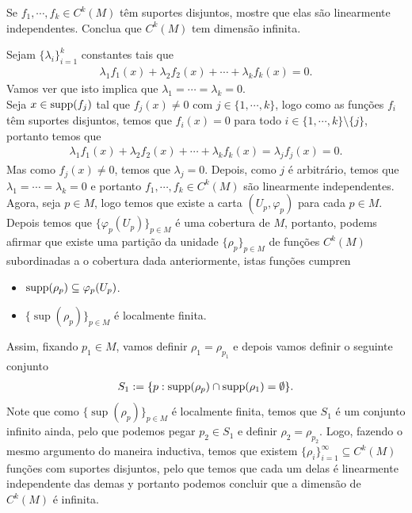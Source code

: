 \begin{homeworkProblem}[Seção 1-6]
  Se $f_{1},\cdots,f_{k}\in C^{k}(M)$ têm suportes disjuntos, mostre que elas são linearmente independentes. Conclua que $C^{k}(M)$ tem dimensão infinita.
  \begin{solution}
    Sejam $\{\lambda_i\}_{i=1}^{k}$ constantes tais que
    \begin{align*}
      \lambda_1 f_1(x)+\lambda_2 f_2(x)+\cdots+\lambda_k f_k(x)=0.
    \end{align*}
    Vamos ver que isto implica que $\lambda_1=\cdots=\lambda_k=0$.\\
    Seja $x\in \operatorname*{supp}(f_j)$ tal que $f_j(x)\neq 0$ com $j\in\{1,\cdots,k\}$, logo como as funções $f_i$ têm suportes disjuntos, temos que $f_{i}(x)=0$ para todo $i\in\{1,\cdots,k\}\setminus\{j\}$, portanto temos que
    \begin{align*} 
      \lambda_1 f_1(x)+\lambda_2 f_2(x)+\cdots+\lambda_k f_k(x)=\lambda_j f_j(x)=0.
    \end{align*}
    Mas como $f_j(x)\neq 0$, temos que $\lambda_j=0$. Depois, como $j$ é arbitrário, temos que $\lambda_1=\cdots=\lambda_k=0$ e portanto $f_1,\cdots,f_k\in C^{k}(M)$ são linearmente independentes.\\
    Agora, seja $p\in M$, logo temos que existe a carta $(U_p,\varphi_p)$ para cada $p\in M$. Depois temos que $\{\varphi_p(U_p)\}_{p\in M}$ é uma cobertura de $M$, portanto, podems afirmar que existe uma partição da unidade $\{\rho_p\}_{p\in M}$ de funções $C^{k}(M)$ subordinadas a o cobertura dada anteriormente, istas funções cumpren
    \begin{itemize}
      \item $\operatorname*{supp}(\rho_p)\subseteq\varphi_p(U_p)$.
      \item $\{\sup(\rho_p)\}_{p\in M}$ é localmente finita. 
    \end{itemize}
    Assim, fixando $p_1\in M$, vamos definir $\rho_1=\rho_{p_1}$ e depois vamos definir o seguinte conjunto
    \begin{align*}
      S_1:=\{p:\operatorname*{supp}(\rho_p)\cap\operatorname*{supp}(\rho_1)=\emptyset\}.
    \end{align*}
    Note que como $\{\sup(\rho_p)\}_{p\in M}$ é localmente finita, temos que $S_1$ é um conjunto infinito ainda, pelo que podemos pegar $p_2\in S_1$ e definir $\rho_2=\rho_{p_2}$. Logo, fazendo o mesmo argumento do maneira inductiva, temos que existem $\{\rho_i\}_{i=1}^{\infty}\subseteq C^{k}(M)$ funções com suportes disjuntos, pelo que temos que cada um delas é linearmente independente das demas y portanto podemos concluir que a dimensão de $C^{k}(M)$ é infinita. 
  \end{solution}
\end{homeworkProblem}
